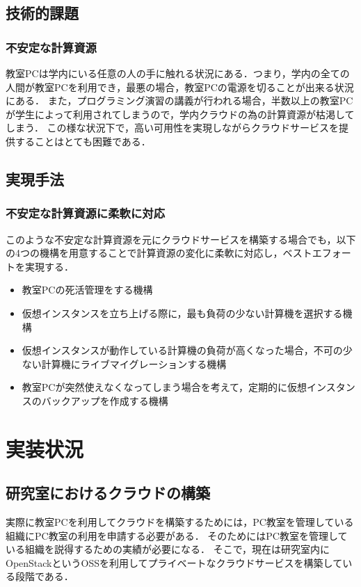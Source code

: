 \documentclass[11pt,a4paper]{jsarticle}
\begin{document}
\subsection{技術的課題}
\subsubsection{不安定な計算資源}
教室PCは学内にいる任意の人の手に触れる状況にある．つまり，学内の全ての人間が教室PCを利用でき，最悪の場合，教室PCの電源を切ることが出来る状況にある．
また，プログラミング演習の講義が行われる場合，半数以上の教室PCが学生によって利用されてしまうので，学内クラウドの為の計算資源が枯渇してしまう．
この様な状況下で，高い可用性を実現しながらクラウドサービスを提供することはとても困難である．
\subsection{実現手法}
\subsubsection{不安定な計算資源に柔軟に対応}
このような不安定な計算資源を元にクラウドサービスを構築する場合でも，以下の4つの機構を用意することで計算資源の変化に柔軟に対応し，ベストエフォートを実現する．
\begin{itemize}
	\item 教室PCの死活管理をする機構
	\item 仮想インスタンスを立ち上げる際に，最も負荷の少ない計算機を選択する機構
	\item 仮想インスタンスが動作している計算機の負荷が高くなった場合，不可の少ない計算機にライブマイグレーションする機構
	\item 教室PCが突然使えなくなってしまう場合を考えて，定期的に仮想インスタンスのバックアップを作成する機構
\end{itemize}

\section{実装状況}
\subsection{研究室におけるクラウドの構築}
実際に教室PCを利用してクラウドを構築するためには，PC教室を管理している組織にPC教室の利用を申請する必要がある．
そのためにはPC教室を管理している組織を説得するための実績が必要になる．
そこで，現在は研究室内にOpenStackというOSSを利用してプライベートなクラウドサービスを構築している段階である．
\end{document}
